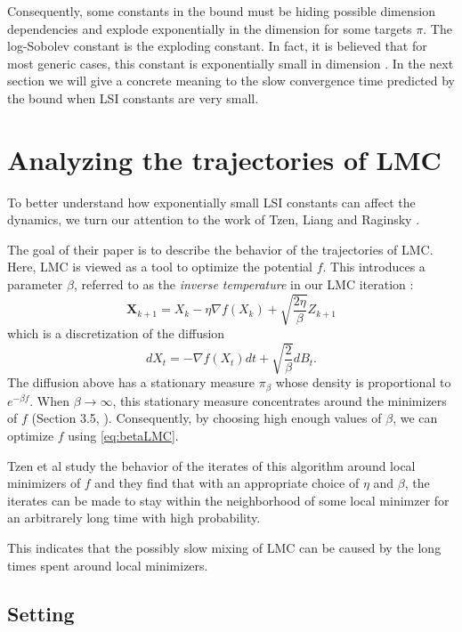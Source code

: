 \documentclass[10pt,journal,a4paper]{IEEEtran}
\theoremstyle{definition}
\begin{document}
Consequently, some constants in the bound must be hiding possible dimension dependencies and explode exponentially in the dimension for some targets $\pi$. The log-Sobolev constant is the exploding constant. In fact, it is believed that for most generic cases, this constant is exponentially small in dimension \cite{raginsky_non-convex_2017}. In the next section we will give a concrete meaning to the slow convergence time predicted by the bound when LSI constants are very small.

\section{Analyzing the trajectories of LMC}

To better understand how exponentially small LSI constants can affect the dynamics, we turn our attention to the work of Tzen, Liang and Raginsky \cite{tzen_local_2018}. 

The goal of their paper is to describe the behavior of the trajectories of LMC. Here, LMC is viewed as a tool to optimize the potential $f$. This introduces a parameter $\beta$, referred to as the \textit{inverse temperature} in our LMC iteration :
\begin{equation}
\label{eq:betaLMC}
\mathbf{X}_{k+1} = X_k - \eta \nabla f(X_k) + \sqrt{\frac{2\eta}{\beta}}Z_{k+1}
\tag{LMC-$\beta$}
\end{equation}
which is a discretization of the diffusion
\begin{equation}
\label{eq:betadiff}
\tag{LD-$\beta$}
dX_t = -\nabla f(X_t)dt + \sqrt{\frac{2}{\beta}}dB_t.
\end{equation}
The diffusion above has a stationary measure $\pi_\beta$ whose density is proportional to $e^{-\beta f}$. When $\beta \rightarrow \infty$, this stationary measure concentrates around the minimizers of $f$ (Section 3.5, \cite{raginsky_non-convex_2017}). Consequently, by choosing high enough values of $\beta$, we can optimize $f$ using \eqref{eq:betaLMC}.

Tzen et al study the behavior of the iterates of this algorithm around local minimizers of $f$ and they find that with an appropriate choice of $\eta$ and $\beta$, the iterates can be made to stay within the neighborhood of some local minimzer for an arbitrarely long time with high probability.

This indicates that the possibly slow mixing of LMC can be caused by the long times spent around local minimizers.


\subsection{Setting}
\end{document}
